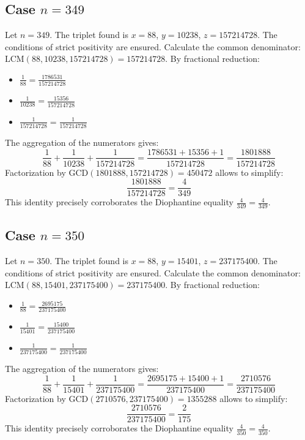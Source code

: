 \documentclass[11pt,a4paper]{article}
\begin{document}
\subsection{Case $n = 349$}
Let $n = 349$. The triplet found is $x = 88$, $y = 10238$, $z = 157214728$.
The conditions of strict positivity are ensured.
Calculate the common denominator: $\text{LCM}(88, 10238, 157214728) = 157214728$.
By fractional reduction:
\begin{itemize}
    \item $\frac{1}{88} = \frac{1786531}{157214728}$
    \item $\frac{1}{10238} = \frac{15356}{157214728}$
    \item $\frac{1}{157214728} = \frac{1}{157214728}$
\end{itemize}
The aggregation of the numerators gives:
$$ \frac{1}{88} + \frac{1}{10238} + \frac{1}{157214728} = \frac{1786531 + 15356 + 1}{157214728} = \frac{1801888}{157214728} $$
Factorization by $\text{GCD}(1801888, 157214728) = 450472$ allows to simplify:
$$ \frac{1801888}{157214728} = \frac{4}{349} $$
This identity precisely corroborates the Diophantine equality $\frac{4}{349} = \frac{4}{349}$.

\subsection{Case $n = 350$}
Let $n = 350$. The triplet found is $x = 88$, $y = 15401$, $z = 237175400$.
The conditions of strict positivity are ensured.
Calculate the common denominator: $\text{LCM}(88, 15401, 237175400) = 237175400$.
By fractional reduction:
\begin{itemize}
    \item $\frac{1}{88} = \frac{2695175}{237175400}$
    \item $\frac{1}{15401} = \frac{15400}{237175400}$
    \item $\frac{1}{237175400} = \frac{1}{237175400}$
\end{itemize}
The aggregation of the numerators gives:
$$ \frac{1}{88} + \frac{1}{15401} + \frac{1}{237175400} = \frac{2695175 + 15400 + 1}{237175400} = \frac{2710576}{237175400} $$
Factorization by $\text{GCD}(2710576, 237175400) = 1355288$ allows to simplify:
$$ \frac{2710576}{237175400} = \frac{2}{175} $$
This identity precisely corroborates the Diophantine equality $\frac{4}{350} = \frac{4}{350}$.
\end{document}
